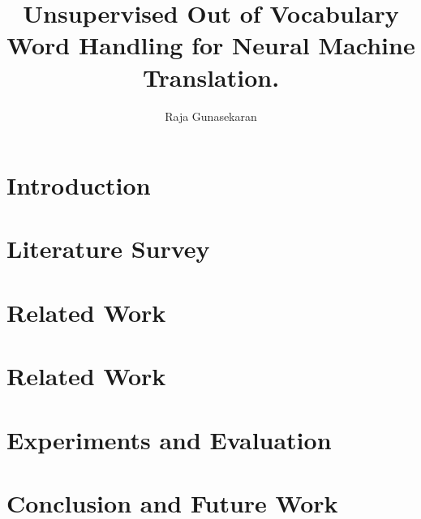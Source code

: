 \documentclass[12pt]{report}
\title{Unsupervised Out of Vocabulary Word Handling for Neural Machine Translation.}
\author{Raja Gunasekaran}
\begin{document}
\maketitle

%

\tableofcontents

\chapter{Introduction}


\chapter{Literature Survey}


\chapter{Related Work}


\chapter{Related Work}


\chapter{Experiments and Evaluation}


\chapter{Conclusion and Future Work}

\end{document}
